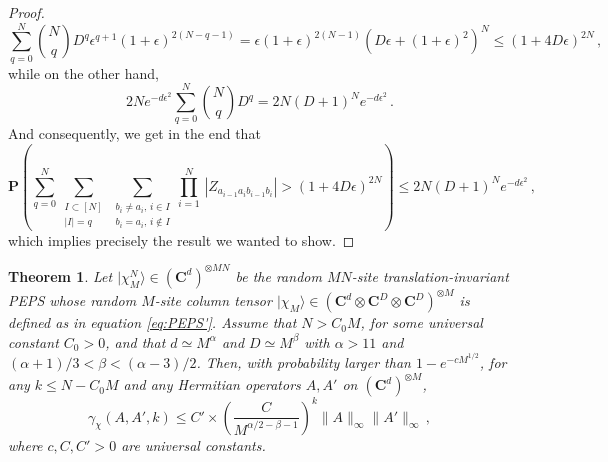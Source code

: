 \documentclass{amsart}
\newtheorem{theorem}{Theorem}[section]
\newcommand{\C}{\mathbf{C}}
\renewcommand{\P}{\mathbf{P}}
\renewcommand{\leq}{\leqslant}
\newcommand{\ket}[1]{| #1 \rangle}
\begin{document}
\begin{proof}
    \[ \sum_{q=0}^N{N \choose q}D^q\epsilon^{q+1}(1+\epsilon)^{2(N-q-1)} = \epsilon(1+\epsilon)^{2(N-1)}\left(D\epsilon+(1+\epsilon)^2\right)^N \leq (1+4D\epsilon)^{2N} \, , \]
    while on the other hand,
    \[ 2Ne^{-d\epsilon^2}\sum_{q=0}^N{N \choose q}D^q=2N(D+1)^Ne^{-d\epsilon^2} \, . \]
    And consequently, we get in the end that
    \[ \P\left( \sum_{q=0}^N \sum_{\substack{I\subset[N] \\ |I|=q}} \sum_{\substack{b_i\neq a_i,\,i\in I \\ b_i=a_i,\,i\notin I}} \underset{i=1}{\overset{N}{\prod}}\, \left|Z_{a_{i-1}a_ib_{i-1}b_i}\right| > (1+4D\epsilon)^{2N} \right) \leq 2N(D+1)^Ne^{-d\epsilon^2} \, , \]
    which implies precisely the result we wanted to show.
\end{proof}

\begin{theorem} \label{th:dc2-PEPS}
    Let $\ket{\chi_M^{N}}\in(\C^d)^{\otimes MN}$ be the random $MN$-site translation-invariant PEPS whose random $M$-site column tensor $\ket{\chi_M}\in(\C^d\otimes\C^D\otimes\C^D)^{\otimes M}$ is defined as in equation \eqref{eq:PEPS'}. Assume that $N>C_0M$, for some universal constant $C_0>0$, and that $d\simeq M^{\alpha}$ and $D\simeq M^{\beta}$ with $\alpha>11$ and $(\alpha+1)/3<\beta<(\alpha-3)/2$. Then, with probability larger than $1-e^{-cM^{1/2}}$, for any $k\leq N-C_0M$ and any Hermitian operators $A,A'$ on $(\C^d)^{\otimes M}$,
    \[ \gamma_{\chi}(A,A',k) \leq C'\times\left(\frac{C}{M^{\alpha/2-\beta-1}}\right)^k\|A\|_{\infty}\|A'\|_{\infty} \, , \]
    where $c,C,C'>0$ are universal constants.
\end{theorem}
\end{document}
